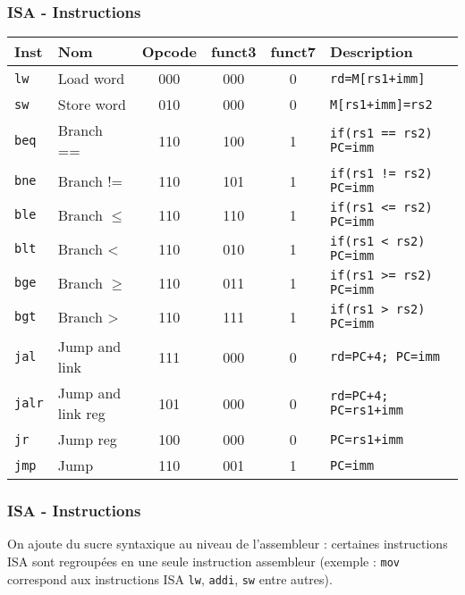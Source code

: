 \documentclass[xcolor=pst,10pt,onlymath]{beamer}
\begin{document}
\begin{frame}
    \frametitle{ISA - Instructions}
    \begin{longtable}{|l|l|c|c|c|l|}
        \hline
        Inst           & Nom                             & Opcode & funct3 & funct7 & Description                   \\
        \hline
        \texttt{lw}    & Load word                       & 000    & 000    & 0      & \texttt{rd=M[rs1+imm]}        \\
        \texttt{sw}    & Store word                      & 010    & 000    & 0      & \texttt{M[rs1+imm]=rs2}       \\
        \hline
        \texttt{beq}   & Branch ==                       & 110    & 100    & 1      & \texttt{if(rs1 == rs2) PC=imm}\\
        \texttt{bne}   & Branch !=                       & 110    & 101    & 1      & \texttt{if(rs1 != rs2) PC=imm}\\
        \texttt{ble}   & Branch \(\leqslant\)            & 110    & 110    & 1      & \texttt{if(rs1 <= rs2) PC=imm}\\
        \texttt{blt}   & Branch <                        & 110    & 010    & 1      & \texttt{if(rs1 < rs2) PC=imm} \\
        \texttt{bge}   & Branch \(\geqslant\)            & 110    & 011    & 1      & \texttt{if(rs1 >= rs2) PC=imm}\\
        \texttt{bgt}   & Branch >                        & 110    & 111    & 1      & \texttt{if(rs1 > rs2) PC=imm} \\
        \hline
        \texttt{jal}   & Jump and link                   & 111    & 000    & 0      &\texttt{rd=PC+4; PC=imm}       \\
        \texttt{jalr}  & Jump and link reg               & 101    & 000    & 0      &\texttt{rd=PC+4; PC=rs1+imm}   \\
        \texttt{jr}    & Jump reg                        & 100    & 000    & 0      &\texttt{PC=rs1+imm}            \\
        \texttt{jmp}   & Jump                            & 110    & 001    & 1      &\texttt{PC=imm}                \\
        \hline
    \end{longtable}
\end{frame}


\Large
\begin{frame}
    \frametitle{ISA - Instructions}
    On ajoute du sucre syntaxique au niveau de l'assembleur : certaines instructions ISA sont regroupées en une seule instruction assembleur (exemple : \texttt{mov} correspond aux instructions ISA \texttt{lw}, \texttt{addi}, \texttt{sw} entre autres).
\end{frame}
\end{document}

